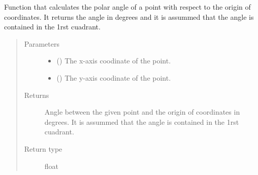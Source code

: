 \documentclass[letterpaper,10pt,english,openany, oneside]{sphinxmanual}
\begin{document}
\begin{fulllineitems}
\label{\detokenize{index:fompy.conditioning.angle_wrt_0}}
Function that calculates the polar angle of a point with respect to the origin of coordinates.
It returns the angle in degrees and it is assummed that the angle is contained in the 1rst cuadrant.
\begin{quote}\begin{description}
\item[{Parameters}] \leavevmode\begin{itemize}
\item {} 
 () \textendash{} The x-axis coodinate of the point.

\item {} 
 () \textendash{} The y-axis coodinate of the point.

\end{itemize}

\item[{Returns}] \leavevmode
{} \textendash{} Angle between the given point and the origin
of coordinates in degrees. It is assummed that the angle is contained
in the 1rst cuadrant.

\item[{Return type}] \leavevmode
float

\end{description}\end{quote}

\end{fulllineitems}

\end{document}
